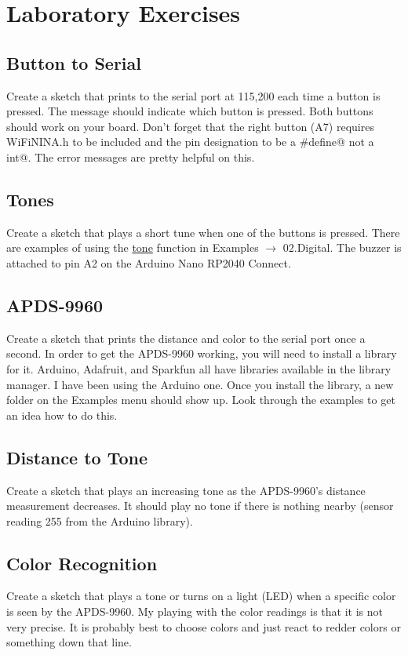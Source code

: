 \section{Laboratory Exercises}
\subsection{Button to Serial}
Create a sketch that prints to the serial port at 115,200 each time a button is pressed. The message should indicate which
button is pressed. Both buttons should work on your board. Don't forget that the right button (A7) requires WiFiNINA.h to
be included and the pin designation to be a \lstinline@#define@ not a \lstinline@const int@. The error messages are pretty helpful on this.

\subsection{Tones}
Create a sketch that plays a short tune when one of the buttons is pressed. There are examples of using the 
\href{https://www.arduino.cc/reference/en/language/functions/advanced-io/tone/}{tone} 
function in Examples $\rightarrow$ 02.Digital. The buzzer is attached to pin A2 on the Arduino Nano RP2040 Connect.

\subsection{APDS-9960}
Create a sketch that prints the distance and color to the serial port once a second. In order to get the APDS-9960 working,
you will need to install a library for it. Arduino, Adafruit, and Sparkfun all have libraries available in the library 
manager. I have been using the Arduino one. Once you install the library, a new folder on the Examples menu should show up. 
Look through the examples to get an idea how to do this. 

\subsection{Distance to Tone}
Create a sketch that plays an increasing tone as the APDS-9960's distance measurement decreases. It should play 
no tone if there is nothing nearby (sensor reading 255 from the Arduino library). 

\subsection{Color Recognition}
Create a sketch that plays a tone or turns on a light (LED) when a specific color is seen by the APDS-9960. My playing with 
the color readings is that it is not very precise. It is probably best to choose colors and just react to redder colors or 
something down that line.

